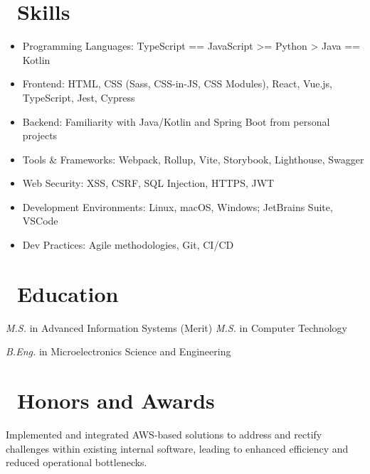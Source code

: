 \documentclass{resume}
\begin{document}
\section{\faCogs\ Skills}
\begin{itemize}[parsep=0.5ex]
  \item Programming Languages: TypeScript == JavaScript >= Python > Java == Kotlin
  \item Frontend: HTML, CSS (Sass, CSS-in-JS, CSS Modules), React, Vue.js, TypeScript, Jest, Cypress
  \item Backend: Familiarity with Java/Kotlin and Spring Boot from personal projects
  \item Tools & Frameworks: Webpack, Rollup, Vite, Storybook, Lighthouse, Swagger
  \item Web Security: XSS, CSRF, SQL Injection, HTTPS, JWT
  \item Development Environments: Linux, macOS, Windows; JetBrains Suite, VSCode
  \item Dev Practices: Agile methodologies, Git, CI/CD
\end{itemize}

\section{\faGraduationCap\ Education}
\textit{M.S.} in Advanced Information Systems (Merit)
\textit{M.S.} in Computer Technology

\textit{B.Eng.} in Microelectronics Science and Engineering

\section{\faHeartO\ Honors and Awards}
Implemented and integrated AWS-based solutions to address and rectify challenges within existing internal software, leading to enhanced efficiency and reduced operational bottlenecks.

\end{document}
